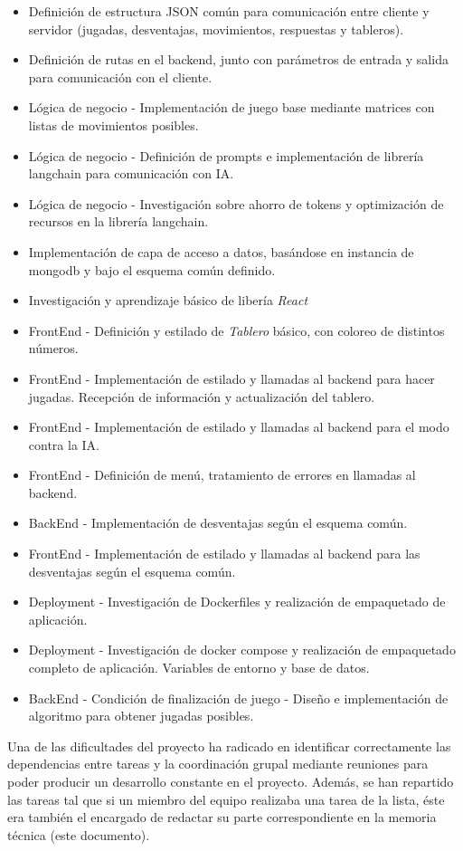 \documentclass[12pt,epsf,titlepage,a4paper]{article}
\begin{document}
\begin{itemize}
    \item Definición de estructura JSON común para comunicación entre cliente y servidor (jugadas, desventajas, movimientos, respuestas y tableros).
    \item Definición de rutas en el backend, junto con parámetros de entrada y salida para comunicación con el cliente.
    \item Lógica de negocio - Implementación de juego base mediante matrices con listas de movimientos posibles.
    \item Lógica de negocio - Definición de prompts e implementación de librería langchain para comunicación con IA.
    \item Lógica de negocio - Investigación sobre ahorro de tokens y optimización de recursos en la librería langchain. 
    \item Implementación de capa de acceso a datos, basándose en instancia de mongodb y bajo el esquema común definido.
    \item Investigación y aprendizaje básico de libería \emph{React}
    \item FrontEnd - Definición y estilado de \emph{Tablero} básico, con coloreo de distintos números.
    \item FrontEnd - Implementación de estilado y llamadas al backend para hacer jugadas. Recepción de información y actualización del tablero.
    \item FrontEnd - Implementación de estilado y llamadas al backend para el modo contra la IA.
    \item FrontEnd - Definición de menú, tratamiento de errores en llamadas al backend.
    \item BackEnd - Implementación de desventajas según el esquema común.
    \item FrontEnd - Implementación de estilado y llamadas al backend para las desventajas según el esquema común.
    \item Deployment - Investigación de Dockerfiles y realización de empaquetado de aplicación.
    \item Deployment - Investigación de docker compose y realización de empaquetado completo de aplicación. Variables de entorno y base de datos.
    \item BackEnd - Condición de finalización de juego - Diseño e implementación de algoritmo para obtener jugadas posibles.
\end{itemize}

Una de las dificultades del proyecto ha radicado en identificar correctamente las dependencias entre tareas y la coordinación grupal mediante reuniones para poder producir un desarrollo constante en el proyecto.
Además, se han repartido las tareas tal que si un miembro del equipo realizaba una tarea de la lista, éste era también el encargado de redactar su parte correspondiente en la memoria técnica (este documento).
\end{document}
